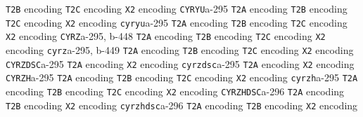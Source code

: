 \documentclass[twoside]{ltxdoc}
\makeatletter
\renewenvironment{theindex}{%
   \@restonecoltrue
   \if@twocolumn\@restonecolfalse\fi
   \columnseprule \z@
   \columnsep 35\p@
   \twocolumn[\index@prologue]%
   \IndexParms
   \let\item\@idxitem
   \ignorespaces
}{\if@restonecol\onecolumn\else\clearpage\fi}
\makeatother
\begin{document}
\begin{theindex}
    \subitem \texttt  {T2B} encoding\pfill {}
    \subitem \texttt  {T2C} encoding\pfill {}
    \subitem \texttt  {X2} encoding\pfill {}
  \item \texttt  {CYRYU}\pfill a-295
    \subitem \texttt  {T2A} encoding\pfill {}
    \subitem \texttt  {T2B} encoding\pfill {}
    \subitem \texttt  {T2C} encoding\pfill {}
    \subitem \texttt  {X2} encoding\pfill {}
  \item \texttt  {cyryu}\pfill a-295
    \subitem \texttt  {T2A} encoding\pfill {}
    \subitem \texttt  {T2B} encoding\pfill {}
    \subitem \texttt  {T2C} encoding\pfill {}
    \subitem \texttt  {X2} encoding\pfill {}
  \item \texttt  {CYRZ}\pfill a-295, b-448
    \subitem \texttt  {T2A} encoding\pfill {}
    \subitem \texttt  {T2B} encoding\pfill {}
    \subitem \texttt  {T2C} encoding\pfill {}
    \subitem \texttt  {X2} encoding\pfill {}
  \item \texttt  {cyrz}\pfill a-295, b-449
    \subitem \texttt  {T2A} encoding\pfill {}
    \subitem \texttt  {T2B} encoding\pfill {}
    \subitem \texttt  {T2C} encoding\pfill {}
    \subitem \texttt  {X2} encoding\pfill {}
  \item \texttt  {CYRZDSC}\pfill a-295
    \subitem \texttt  {T2A} encoding\pfill {}
    \subitem \texttt  {X2} encoding\pfill {}
  \item \texttt  {cyrzdsc}\pfill a-295
    \subitem \texttt  {T2A} encoding\pfill {}
    \subitem \texttt  {X2} encoding\pfill {}
  \item \texttt  {CYRZH}\pfill a-295
    \subitem \texttt  {T2A} encoding\pfill {}
    \subitem \texttt  {T2B} encoding\pfill {}
    \subitem \texttt  {T2C} encoding\pfill {}
    \subitem \texttt  {X2} encoding\pfill {}
  \item \texttt  {cyrzh}\pfill a-295
    \subitem \texttt  {T2A} encoding\pfill {}
    \subitem \texttt  {T2B} encoding\pfill {}
    \subitem \texttt  {T2C} encoding\pfill {}
    \subitem \texttt  {X2} encoding\pfill {}
  \item \texttt  {CYRZHDSC}\pfill a-296
    \subitem \texttt  {T2A} encoding\pfill {}
    \subitem \texttt  {T2B} encoding\pfill {}
    \subitem \texttt  {X2} encoding\pfill {}
  \item \texttt  {cyrzhdsc}\pfill a-296
    \subitem \texttt  {T2A} encoding\pfill {}
    \subitem \texttt  {T2B} encoding\pfill {}
    \subitem \texttt  {X2} encoding\pfill {}


\end{theindex}
\end{document}
